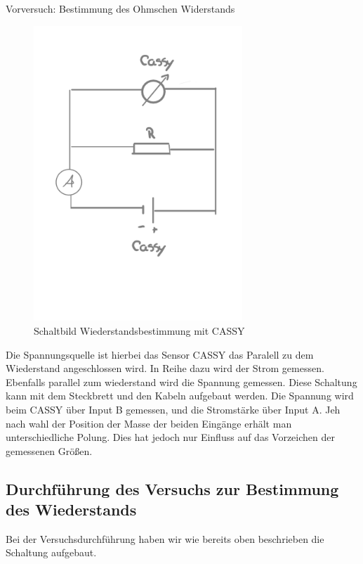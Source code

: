 \documentclass[twoside]{protokoll}
\begin{document}
\begin{aufgabe}{Vorversuch: Bestimmung des Ohmschen Widerstands}
  \begin{figure}[H]
  \centering
  \includegraphics[width=0.7\textwidth]{Schaltung_R_Cassy.pdf}
  \caption{Schaltbild Wiederstandsbestimmung mit CASSY}
  \centering
  \end{figure}
 
 Die Spannungsquelle ist hierbei das Sensor CASSY das Paralell zu dem Wiederstand angeschlossen wird. In Reihe dazu wird der Strom gemessen. 
 Ebenfalls parallel zum wiederstand wird die Spannung gemessen. Diese Schaltung kann mit dem Steckbrett und den Kabeln aufgebaut werden. 
 Die Spannung wird beim CASSY über Input B gemessen, und die Stromstärke über Input A. 
 Jeh nach wahl der Position der Masse der beiden Eingänge erhält man unterschiedliche Polung. Dies hat jedoch nur Einfluss auf das Vorzeichen der gemessenen Größen. 

\subsection{Durchführung des Versuchs zur Bestimmung des Wiederstands}
Bei der Versuchsdurchführung haben wir wie bereits oben beschrieben die Schaltung aufgebaut.\\
 

\end{aufgabe}
\end{document}
